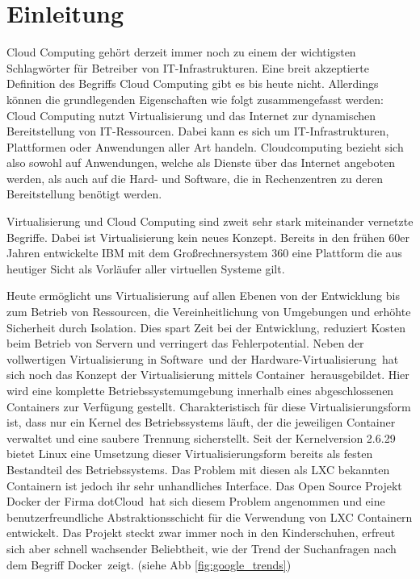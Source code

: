 \chapter{Einleitung}
\label{sec:einleitung}

Cloud Computing gehört derzeit immer noch zu einem der wichtigsten Schlagwörter für Betreiber von IT-Infrastrukturen.
\glqq Eine breit akzeptierte Definition des Begriffs Cloud Computing gibt es bis heute nicht. Allerdings können die grundlegenden Eigenschaften wie folgt zusammengefasst werden: Cloud Computing nutzt Virtualisierung und das Internet zur dynamischen Bereitstellung von IT-Ressourcen. Dabei kann es sich um IT-Infrastrukturen, Plattformen oder Anwendungen aller Art handeln.\grqq \cite[S. 28]{meinel_virtualisierung_2011} Cloudcomputing bezieht sich also sowohl auf Anwendungen, welche als Dienste über das Internet angeboten werden, als auch auf die Hard- und Software, die in Rechenzentren zu deren Bereitstellung benötigt werden.

Virtualisierung und Cloud Computing sind zweit sehr stark miteinander vernetzte Begriffe.
Dabei ist Virtualisierung kein neues Konzept. Bereits in den frühen 60er Jahren entwickelte IBM mit dem Großrechnersystem 360 eine Plattform die aus heutiger Sicht als Vorläufer aller virtuellen Systeme gilt. \cite{frank_balmes_grin_2008}

Heute ermöglicht uns Virtualisierung auf \glqq allen Ebenen von der Entwicklung bis zum Betrieb von Ressourcen, die Vereinheitlichung von Umgebungen und erhöhte Sicherheit durch Isolation. Dies spart Zeit bei der Entwicklung, reduziert Kosten beim Betrieb von Servern und verringert das Fehlerpotential.\grqq \cite[S. 1]{schroder_container-virtualisierung_2014}
Neben der vollwertigen \grq Virtualisierung in Software\grq\ und der \grq Hardware-Virtualisierung\grq\ hat sich noch das Konzept der \grq Virtualisierung mittels Container\grq\ herausgebildet.
\glqq Hier wird eine komplette Betriebssystemumgebung innerhalb eines abgeschlossenen Containers zur Verfügung gestellt. Charakteristisch für diese Virtualisierungsform ist, dass nur ein Kernel des Betriebssystems läuft, der die jeweiligen Container verwaltet und eine saubere Trennung sicherstellt.\grqq \cite{plotner_linux_2012}
Seit der Kernelversion 2.6.29 \cite{fischer_linux_2014} bietet Linux eine Umsetzung dieser Virtualisierungsform bereits als festen Bestandteil des Betriebssystems.
Das Problem mit diesen als LXC bekannten Containern ist jedoch ihr sehr unhandliches Interface.
Das Open Source Projekt Docker der Firma \grq dotCloud\grq\ hat sich diesem Problem angenommen und eine benutzerfreundliche Abstraktionsschicht für die Verwendung von LXC Containern entwickelt. Das Projekt steckt zwar immer noch in den Kinderschuhen, erfreut sich aber schnell wachsender Beliebtheit, wie der Trend der Suchanfragen nach dem Begriff \grq Docker\grq\ zeigt. (siehe Abb \ref{fig:google_trends}) 

